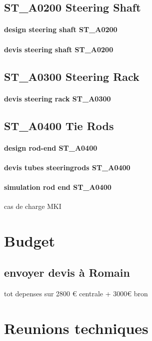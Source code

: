 	\subsection*{ST\_A0200 Steering Shaft} 
 \par 
		\paragraph{design steering shaft ST\_A0200} 
		\paragraph{devis steering shaft ST\_A0200} 
	\subsection*{ST\_A0300 Steering Rack} 
 \par 
		\paragraph{devis steering rack ST\_A0300} 
	\subsection*{ST\_A0400 Tie Rods} 
 \par 
		\paragraph{design rod-end ST\_A0400} 
		\paragraph{devis tubes steeringrods ST\_A0400} 
		\paragraph{simulation rod end ST\_A0400} cas de charge MKI
\newpage 
 \section*{Budget} 
 \par 
	\subsection*{envoyer devis à Romain} 
 \par tot depenses sur 2800 € centrale + 3000€ bron
\newpage 
 \section*{Reunions techniques} 
 \par 
